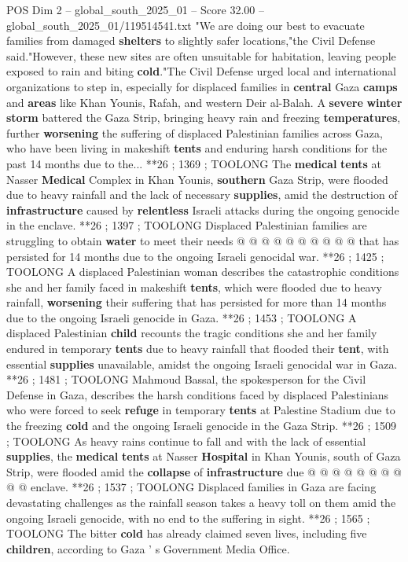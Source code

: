 \begin{textsample}{POS Dim 2 – global\_south\_2025\_01 – Score 32.00 – global\_south\_2025\_01/119514541.txt}  \label{ex:f2_pos_311}
"We are doing our best to evacuate families from damaged \textbf{shelters} to slightly safer locations,"the Civil Defense said."However, these new sites are often unsuitable for habitation, leaving people exposed to rain and biting \textbf{cold}."The Civil Defense urged local and international organizations to step in, especially for displaced families in \textbf{central} Gaza \textbf{camps} and \textbf{areas} like Khan Younis, Rafah, and western Deir al-Balah.
A \textbf{severe} \textbf{winter} \textbf{storm} battered the Gaza Strip, bringing heavy rain and freezing \textbf{temperatures}, further \textbf{worsening} the suffering of displaced Palestinian families across Gaza, who have been living in makeshift \textbf{tents} and enduring harsh conditions for the past 14 months due to the... **26 ; 1369 ; TOOLONG The \textbf{medical} \textbf{tents} at Nasser \textbf{Medical} Complex in Khan Younis, \textbf{southern} Gaza Strip, were flooded due to heavy rainfall and the lack of necessary \textbf{supplies}, amid the destruction of \textbf{infrastructure} caused by \textbf{relentless} Israeli attacks during the ongoing genocide in the enclave. **26 ; 1397 ; TOOLONG Displaced Palestinian families are struggling to obtain \textbf{water} to meet their needs @ @ @ @ @ @ @ @ @ @ that has persisted for 14 months due to the ongoing Israeli genocidal war. **26 ; 1425 ; TOOLONG A displaced Palestinian woman describes the catastrophic conditions she and her family faced in makeshift \textbf{tents}, which were flooded due to heavy rainfall, \textbf{worsening} their suffering that has persisted for more than 14 months due to the ongoing Israeli genocide in Gaza. **26 ; 1453 ; TOOLONG A displaced Palestinian \textbf{child} recounts the tragic conditions she and her family endured in temporary \textbf{tents} due to heavy rainfall that flooded their \textbf{tent}, with essential \textbf{supplies} unavailable, amidst the ongoing Israeli genocidal war in Gaza. **26 ; 1481 ; TOOLONG Mahmoud Bassal, the spokesperson for the Civil Defense in Gaza, describes the harsh conditions faced by displaced Palestinians who were forced to seek \textbf{refuge} in temporary \textbf{tents} at Palestine Stadium due to the freezing \textbf{cold} and the ongoing Israeli genocide in the Gaza Strip. **26 ; 1509 ; TOOLONG As heavy rains continue to fall and with the lack of essential \textbf{supplies}, the \textbf{medical} \textbf{tents} at Nasser \textbf{Hospital} in Khan Younis, south of Gaza Strip, were flooded amid the \textbf{collapse} of \textbf{infrastructure} due @ @ @ @ @ @ @ @ @ @ enclave. **26 ; 1537 ; TOOLONG Displaced families in Gaza are facing devastating challenges as the rainfall season takes a heavy toll on them amid the ongoing Israeli genocide, with no end to the suffering in sight. **26 ; 1565 ; TOOLONG The bitter \textbf{cold} has already claimed seven lives, including five \textbf{children}, according to Gaza ' s Government Media Office.

\end{textsample}
